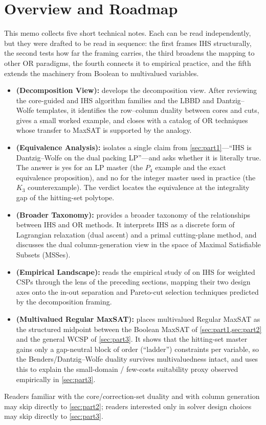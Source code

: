 \section{Overview and Roadmap}
\label{sec:overview}

This memo collects five short technical notes. Each can be read
independently, but they were drafted to be read in sequence: the first
frames IHS structurally, the second tests how far the framing carries, the
third broadens the mapping to other OR paradigms, the fourth connects
it to empirical practice, and the fifth extends the machinery from Boolean
to multivalued variables.

\begin{itemize}
\item \textbf{ (Decomposition View):} develops the decomposition view. After reviewing the
core-guided and IHS algorithm families and the LBBD and Dantzig--Wolfe
templates, it identifies the row--column duality between cores and cuts,
gives a small worked example, and closes with a catalog of OR techniques
whose transfer to MaxSAT is supported by the analogy.

\item \textbf{ (Equivalence Analysis):} isolates a single claim from \cref{sec:part1}---``IHS
is Dantzig--Wolfe on the dual packing LP''---and asks whether it is literally
true. The answer is yes for an LP master (the $P_4$ example and the exact
equivalence proposition), and no for the integer master used in practice
(the $K_3$ counterexample). The verdict locates the equivalence at the
integrality gap of the hitting-set polytope.

\item \textbf{ (Broader Taxonomy):} provides a broader taxonomy of the relationships
between IHS and OR methods. It interprets IHS as a discrete form of
Lagrangian relaxation (dual ascent) and a primal cutting-plane method, and
discusses the dual column-generation view in the space of Maximal
Satisfiable Subsets (MSSes).

\item \textbf{ (Empirical Landscape):} reads the empirical study of
\citet{petrova2025empirical} on IHS for weighted CSPs through the lens of
the preceding sections, mapping their two design axes onto the in-out
separation and Pareto-cut selection techniques predicted by the
decomposition framing.

\item \textbf{ (Multivalued Regular MaxSAT):} places
multivalued Regular MaxSAT as the structured midpoint between the Boolean
MaxSAT of \cref{sec:part1,sec:part2} and the general WCSP of \cref{sec:part3}.
It shows that the hitting-set master gains only a gap-neutral block of order
(``ladder'') constraints per variable, so the Benders/Dantzig--Wolfe duality
survives multivaluedness intact, and uses this to explain the small-domain /
few-costs suitability proxy observed empirically in \cref{sec:part3}.
\end{itemize}

Readers familiar with the core/correction-set duality and with column
generation may skip directly to \cref{sec:part2}; readers interested only in
solver design choices may skip directly to \cref{sec:part3}.
